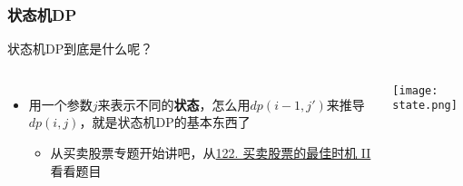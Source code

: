 \subsubsection{状态机\textsc{DP}}


\begin{frame}[fragile]{状态机\textsc{DP}到底是什么呢？}
  \begin{columns}[T]
    \begin{itemize}
      \item 用一个参数$j$来表示不同的\textbf{状态}，怎么用$dp(i-1,j')$来推导$dp(i,j)$，就是状态机\textsc{DP}的基本东西了
            \begin{itemize}
              \item 从买卖股票专题开始讲吧，从\href{https://leetcode.cn/problems/best-time-to-buy-and-sell-stock-ii}{122. 买卖股票的最佳时机 II}看看题目
            \end{itemize}
    \end{itemize}
    \centering
    \texttt{[image: state.png]}
  \end{columns}
\end{frame}




